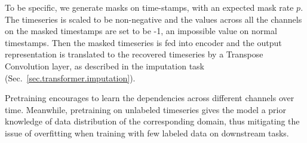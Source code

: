 \begin{sloppypar}
To be specific, we generate masks on time-stamps, with an expected mask rate $p$. The timeseries is scaled to be non-negative and the values across all the channels on the masked timestamps are set to be -1, an impossible value on normal timestamps. Then the masked timeseries is fed into \system encoder and the output representation is translated to the recovered timeseries by a Transpose Convolution layer, as described in the imputation task (Sec.~\ref{sec.transformer.imputation}).

Pretraining encourages \system to learn the dependencies across different channels over time. Meanwhile, pretraining on unlabeled timeseries gives the model a prior knowledge of data distribution of the corresponding domain, thus mitigating the issue of overfitting when training with few labeled data on downstream tasks.
\end{sloppypar}













